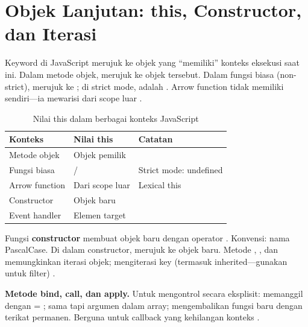 ﻿\section{Objek Lanjutan: this, Constructor, dan Iterasi}

Keyword  di JavaScript merujuk ke objek yang ``memiliki'' konteks eksekusi saat ini. Dalam metode objek,  merujuk ke objek tersebut. Dalam fungsi biasa (non-strict),  merujuk ke ; di strict mode,  adalah . Arrow function tidak memiliki  sendiri---ia mewarisi dari scope luar \cite{jsInfo}.

\begin{table}[H]
\centering
\begin{tabular}{|P{3.5cm}|P{4cm}|P{4.5cm}|}
\hline
\textbf{Konteks} & \textbf{Nilai this} & \textbf{Catatan} \\
\hline
Metode objek & Objek pemilik &  \\
\hline
Fungsi biasa &  /  & Strict mode: undefined \\
\hline
Arrow function & Dari scope luar & Lexical this \\
\hline
Constructor & Objek baru &  \\
\hline
Event handler & Elemen target &  \\
\hline
\end{tabular}
\caption{Nilai this dalam berbagai konteks JavaScript}
\end{table}

Fungsi \textbf{constructor} membuat objek baru dengan operator . Konvensi: nama PascalCase. Di dalam constructor,  merujuk ke objek baru. Metode , , dan  memungkinkan iterasi objek;  mengiterasi key (termasuk inherited---gunakan  untuk filter) \cite{mdnJsGuide}.

\begin{konsep}
\textbf{Metode bind, call, dan apply.} Untuk mengontrol  secara eksplisit:  memanggil  dengan  = ;  sama tapi argumen dalam array;  mengembalikan fungsi baru dengan  terikat permanen. Berguna untuk callback yang kehilangan konteks  \cite{jsInfo}.
\end{konsep}

